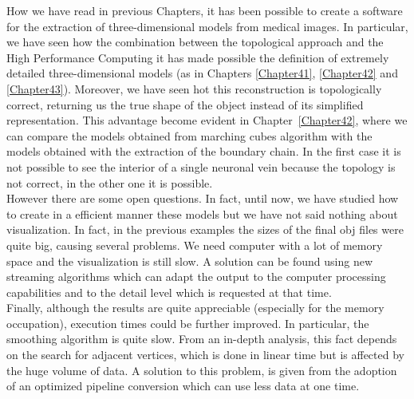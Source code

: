 How we have read in previous Chapters, it has been possible to create a software for the extraction of three-dimensional models from medical images. In particular, we have seen how the combination between the topological approach and the High Performance Computing it has made possible the definition of extremely detailed three-dimensional models (as in Chapters \ref{Chapter41}, \ref{Chapter42} and \ref{Chapter43}). Moreover, we have seen hot this reconstruction is topologically correct, returning us the true shape of the object instead of its simplified representation. This advantage become evident in Chapter~\ref{Chapter42}, where we can compare the models obtained from marching cubes algorithm with the models obtained with the extraction of the boundary chain. In the first case it is not possible to see the interior of a single neuronal vein because the topology is not correct, in the other one it is possible.\\

However there are some open questions. In fact, until now, we have studied how to create in a efficient manner these models but we have not said nothing about visualization. In fact, in the previous examples the sizes of the final obj files were quite big, causing several problems. We need computer with a lot of memory space and the visualization is still slow. A solution can be found using new streaming algorithms which can adapt the output to the computer processing capabilities and to the detail level which is requested at that time.\\ 

Finally, although the results are quite appreciable (especially for the memory occupation), execution times could be further improved. In particular, the smoothing algorithm is quite slow. From an in-depth analysis, this fact depends on the search for adjacent vertices, which is done in linear time but is affected by the huge volume of data. A solution to this problem, is given from the adoption of an optimized pipeline conversion which can use less data at one time.